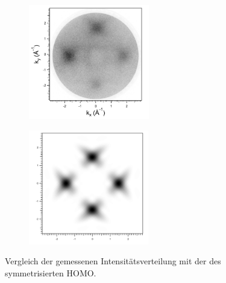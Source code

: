         \begin{figure}
            \centering
            \begin{subfigure}[t]{0.48\textwidth}
                \centering
                \includegraphics[height=5cm]{./content/pictures/FeO+5A/FeO_5A_33_75eV.png}
            \end{subfigure}
            \begin{subfigure}[t]{0.48\textwidth}
                \centering
                \includegraphics[height=5cm]{./content/pictures/FeO+5A/MO_HOMO_RT_RT.png}
            \end{subfigure}
            \caption{Vergleich der gemessenen Intensitätsverteilung mit der des symmetrisierten HOMO.}
            \label{fig:FeO5A2}
        \end{figure}
